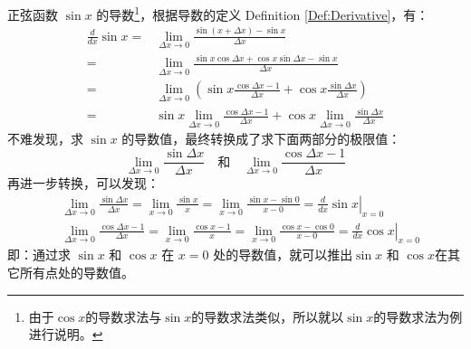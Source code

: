\documentclass{ctexart}
\numberwithin{equation}{section}
\numberwithin{figure}{section}
\begin{document}
正弦函数 \(\sin x\) 的导数\footnote{由于\(\cos x\)的导数求法与\(\sin x\)的导数求法类似，所以就以\(\sin x\)的导数求法为例进行说明。}，根据导数的定义 Definition \ref{Def:Derivative}，有：
\begin{equation}\label{eq:DerivativeofSine}
    \begin{aligned}
        \frac{d}{dx}\sin x = & \lim\limits_{\Delta x \to 0}\frac{\sin(x + \Delta x) - \sin x}{\Delta x}                                                                    \\
        =                    & \lim\limits_{\Delta x \to 0}\frac{\sin x \cos\Delta x + \cos x \sin\Delta x  - \sin x}{\Delta x}                                            \\
        =                    & \lim\limits_{\Delta x \to 0} \left(\sin x\frac{\cos \Delta x - 1}{\Delta x}  + \cos x \frac{\sin \Delta x}{\Delta x} \right)                \\
        =                    & \sin x \lim\limits_{\Delta x \to 0} \frac{\cos \Delta x - 1}{\Delta x} + \cos x \lim\limits_{\Delta x \to 0} \frac{\sin \Delta x}{\Delta x}
    \end{aligned}
\end{equation}
不难发现，求 \(\sin x\) 的导数值，最终转换成了求下面两部分的极限值：
\begin{equation*}
    \lim\limits_{\Delta x \to 0} \frac{\sin \Delta x}{\Delta x} \quad \text{和} \quad \lim\limits_{\Delta x \to 0} \frac{\cos \Delta x - 1}{\Delta x}
\end{equation*}
再进一步转换，可以发现：
\begin{align}
     & \lim\limits_{\Delta x \to 0} \frac{\sin \Delta x}{\Delta x} =
    \lim\limits_{x \to 0} \frac{\sin x}{x} = \lim\limits_{x \to 0} \frac{\sin x  - \sin 0}{x - 0} = \left.\frac{d}{dx}\sin x\right|_{x=0}                                                                          \\
     & \lim\limits_{\Delta x \to 0} \frac{\cos \Delta x - 1}{\Delta x} = \lim\limits_{x \to 0} \frac{\cos x - 1}{x} = \lim\limits_{x \to 0} \frac{\cos x - \cos 0}{x - 0} = \left.\frac{d}{dx}\cos x \right|_{x=0}
\end{align}
即：通过求 \(\sin x\) 和 \(\cos x\) 在 \(x = 0\) 处的导数值，就可以推出\(\sin x\) 和 \(\cos x\)在其它所有点处的导数值。
\end{document}
